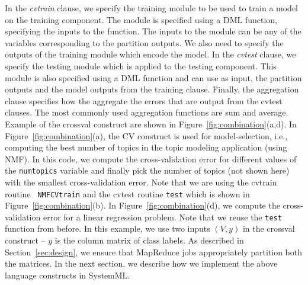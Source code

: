 \documentclass{vldb}
\begin{document}
In the {\em cvtrain} clause, we specify the training module to be used
to train a model on the training component. The module is specified using a
DML function, specifying the inputs to the function. The inputs to the module
can be any of the variables corresponding to the partition outputs. We also need
to specify the outputs of the training module which encode the model. In the
{\em cvtest} clause, we specify the testing module which is applied to the
testing component. This module is also specified using a DML function and can
use as input, the partition outputs and the model outputs from the training
clause. Finally, the aggregation clause specifies how the aggregate the errors
that are output from the cvtest clauses. The most commonly used aggregation
functions are sum and average. Example of the crossval construct are shown in
Figure~\ref{fig:combination}(a,d). In Figure~\ref{fig:combination}(a), the CV
construct is used for model-selection, i.e., computing the best number of topics
in the topic modeling application (using NMF). In this code, we compute the
cross-validation error for different values of the {\tt numtopics} variable and
finally pick the number of topics (not shown here) with the smallest
cross-validation error. Note that we are using the cvtrain routine {\tt
NMFCVtrain} and the cvtest routine {\tt test} which is shown in
Figure~\ref{fig:combination}(b).
In Figure~\ref{fig:combination}(d), we compute
the cross-validation error for a linear regression problem. Note that we reuse
the {\tt test} function from before. In this example, we use two inputs $(V,y)$
in the crossval construct -- $y$ is the column matrix of class labels. As described in
Section~\ref{sec:design}, we ensure that MapReduce jobs appropriately
partition both the matrices. In the next section, we describe how we implement
the above language constructs in SystemML.
\end{document}
